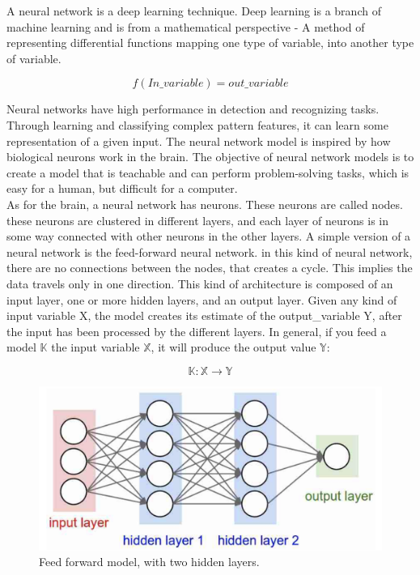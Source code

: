 A neural network is a deep learning technique. Deep learning is a branch of machine learning and is from a mathematical perspective - A method of representing differential functions mapping one type of variable, into another type of variable.

$$
f(In\_variable) = out\_variable
$$

\noindent
Neural networks have high performance in detection and recognizing tasks. Through learning and classifying complex pattern features, it can learn some representation of a given input. The neural network model is inspired by how biological neurons work in the brain. The objective of neural network models is to create a model that is teachable and can perform problem-solving tasks, which is easy for a human, but difficult for a computer.\\

\noindent
As for the brain, a neural network has neurons. These neurons are called nodes. these neurons are clustered in different layers, and each layer of neurons is in some way connected with other neurons in the other layers.  A simple version of a neural network is the feed-forward neural network. in this kind of neural network, there are no connections between the nodes, that creates a cycle. This implies the data travels only in one direction. This kind of architecture is composed of an input layer, one or more hidden layers, and an output layer. Given any kind of input variable X, the model creates its estimate of the output\_variable Y, after the input has been processed by the different layers.
In general, if you feed a model $\mathbb{K}$ the input variable $\mathbb{X}$, it will produce the output value $\mathbb{Y}:$

$$
\mathbb{K}: \mathbb{X} \to \mathbb{Y}
$$

\begin{figure}[!ht]
  \centering
  \includegraphics[scale=0.4]{latex/imgs/NN.png}
  \caption{Feed forward model, with two hidden layers.}\label{Baseline:before}
\end{figure}

